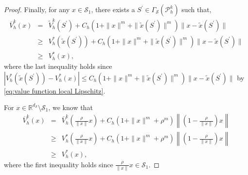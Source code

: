 \documentclass[10pt,a4paper]{amsart}
\begin{document}
\begin{proof}
 

  Finally, for any $x\in \mathcal{S}_{1}$,  there exists a $S^{\prime}\in \Gamma_{\mathcal{S}}(\mathcal{P}_h^k)$ such that,
   \begin{eqnarray*}
           \overline{V}_{h}^{k}(x)&=&\widetilde{V}_{h}^{k}(S^{\prime})+C_h(1+\|x\|^m+\|\tilde{x}(S^{\prime})\|^m)\|x-\tilde{x}(S^{\prime})\|\\
           &\geq&V_{h}^{*}(\tilde{x}(S^{\prime}))+C_h(1+\|x\|^m+\|\tilde{x}(S^{\prime})\|^m)\|x-\tilde{x}(S^{\prime})\|\\
           &\geq& V_{h}^{*}(x),      
   \end{eqnarray*}
where the last inequality holds since $|V_{h}^{*}(\tilde{x}(S^{\prime}))-V_{h}^{*}(x)|\leq C_h(1+\|x\|^m+\|\tilde{x}(S^{\prime})\|^m)\|x-\tilde{x}(S^{\prime})\|$ by \eqref{eq:value function local Lipschitz}.

For $x\in \mathbb{R}^{d_{\mathcal{S}}}\setminus \mathcal{S}_{1}$, we know that 
\begin{eqnarray*}
        \overline{V}_{h}^{k}(x)&=&\overline{V}_{h}^{k}\left(\frac{\rho}{\|x\|}x\right)+C_h(1+\|x\|^{m}+\rho^{m})\left\|\left(1-\frac{\rho}{\|x\|}\right)x\right\|\\
        &\geq& V_{h}^{*}(\frac{\rho}{\|x\|}x)+C_h(1+\|x\|^{m}+\rho^{m})\left\|(1-\frac{\rho}{\|x\|})x\right\|\\
        &\geq& V_{h}^{*}(x), 
\end{eqnarray*}
where the first inequality holds since $\frac{\rho}{\|x\|}x\in \mathcal{S}_{1}$.
\end{proof}
\end{document}
